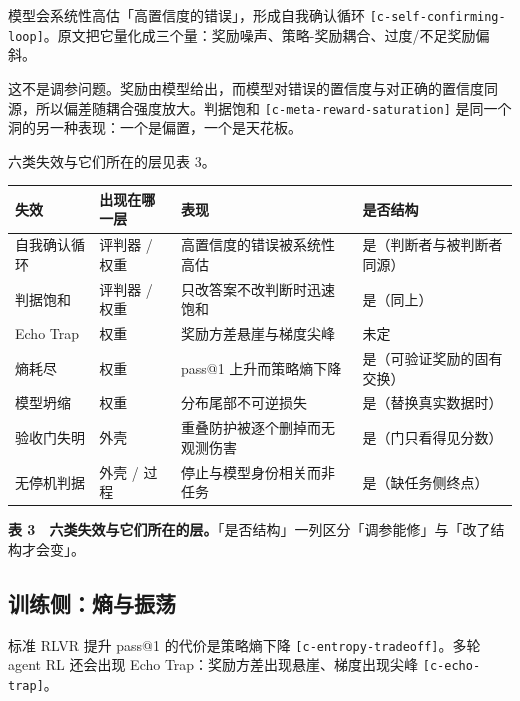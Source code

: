 模型会系统性高估「高置信度的错误」，形成自我确认循环 {\scriptsize\texttt{[c-\hspace{0pt}self-\hspace{0pt}confirming-\hspace{0pt}loop]}}。原文把它量化成三个量：奖励噪声、策略-奖励耦合、过度/不足奖励偏斜。


这不是调参问题。奖励由模型给出，而模型对错误的置信度与对正确的置信度同源，所以偏差随耦合强度放大。判据饱和 {\scriptsize\texttt{[c-\hspace{0pt}meta-\hspace{0pt}reward-\hspace{0pt}saturation]}} 是同一个洞的另一种表现：一个是偏置，一个是天花板。


六类失效与它们所在的层见表 3。


\begin{table}[t]
\centering
\footnotesize
\setlength{\tabcolsep}{4pt}
\label{tab:3}
\begin{tabular}{llll}
\toprule
失效 & 出现在哪一层 & 表现 & 是否结构 \\
\midrule
自我确认循环 & 评判器 / 权重 & 高置信度的错误被系统性高估 & 是（判断者与被判断者同源） \\
判据饱和 & 评判器 / 权重 & 只改答案不改判断时迅速饱和 & 是（同上） \\
Echo Trap & 权重 & 奖励方差悬崖与梯度尖峰 & 未定 \\
熵耗尽 & 权重 & pass@1 上升而策略熵下降 & 是（可验证奖励的固有交换） \\
模型坍缩 & 权重 & 分布尾部不可逆损失 & 是（替换真实数据时） \\
验收门失明 & 外壳 & 重叠防护被逐个删掉而无观测伤害 & 是（门只看得见分数） \\
无停机判据 & 外壳 / 过程 & 停止与模型身份相关而非任务 & 是（缺任务侧终点） \\
\bottomrule
\end{tabular}
\end{table}

\textbf{表 3　六类失效与它们所在的层。}「是否结构」一列区分「调参能修」与「改了结构才会变」。


\subsection{训练侧：熵与振荡}

标准 RLVR 提升 pass@1 的代价是策略熵下降 {\scriptsize\texttt{[c-\hspace{0pt}entropy-\hspace{0pt}tradeoff]}}。多轮 agent RL 还会出现 Echo Trap：奖励方差出现悬崖、梯度出现尖峰 {\scriptsize\texttt{[c-\hspace{0pt}echo-\hspace{0pt}trap]}}。


